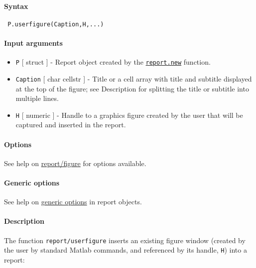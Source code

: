 


	\paragraph{Syntax}
 
 \begin{verbatim}
 P.userfigure(Caption,H,...)
 \end{verbatim}
 
 \paragraph{Input arguments}
 
 \begin{itemize}
 \item
   \texttt{P} {[} struct {]} - Report object created by the
   \href{report/new}{\texttt{report.new}} function.
 \item
   \texttt{Caption} {[} char \textbar{} cellstr {]} - Title or a cell
   array with title and subtitle displayed at the top of the figure; see
   Description for splitting the title or subtitle into multiple lines.
 \item
   \texttt{H} {[} numeric {]} - Handle to a graphics figure created by
   the user that will be captured and inserted in the report.
 \end{itemize}
 
 \paragraph{Options}
 
 See help on \url{report/figure} for options available.
 
 \paragraph{Generic options}
 
 See help on \href{report/Contents}{generic options} in report objects.
 
 \paragraph{Description}
 
 The function \texttt{report/userfigure} inserts an existing figure
 window (created by the user by standard Matlab commands, and referenced
 by its handle, \texttt{H}) into a report:
 
